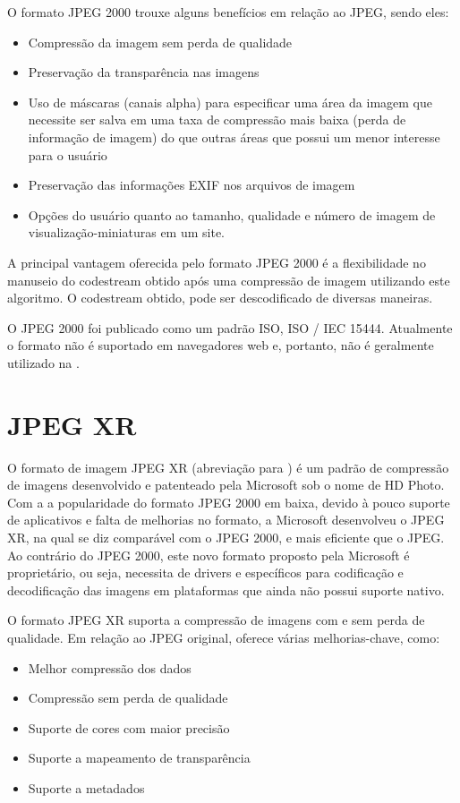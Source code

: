 \documentclass[espaco=simples,appendix=Name]{abnt}
\begin{document}
O formato JPEG 2000 trouxe alguns benefícios em relação ao JPEG, sendo eles:
\begin{itemize}
	\item Compressão da imagem sem perda de qualidade
	\item Preservação da transparência nas imagens
	\item Uso de máscaras (canais alpha) para especificar uma área da imagem que necessite ser salva em uma taxa de compressão mais baixa (perda de informação de imagem) do que outras áreas que possui um menor interesse para o usuário
	\item Preservação das informações EXIF nos arquivos de imagem
	\item Opções do usuário quanto ao tamanho, qualidade e número de imagem de visualização-miniaturas em um site.
\end{itemize}

A principal vantagem oferecida pelo formato JPEG 2000 é a flexibilidade no manuseio do codestream obtido após uma compressão de imagem utilizando este algoritmo. O codestream obtido, pode ser descodificado de diversas maneiras.

O JPEG 2000 foi publicado como um padrão ISO, ISO / IEC 15444. Atualmente o formato não é suportado em navegadores web e, portanto, não é geralmente utilizado na .\cite{JPEG}

\section{JPEG XR}

O formato de imagem JPEG XR (abreviação para ) é um padrão de compressão de imagens desenvolvido e patenteado pela Microsoft sob o nome de HD Photo.
Com a a popularidade do formato JPEG 2000 em baixa, devido à pouco suporte de aplicativos e falta de melhorias no formato, a Microsoft desenvolveu o JPEG XR, na qual se diz comparável com o JPEG 2000, e mais eficiente que o JPEG. Ao contrário do JPEG 2000, este novo formato proposto pela Microsoft é proprietário, ou seja, necessita de drivers e  específicos para codificação e decodificação das imagens em plataformas que ainda não possui suporte nativo.

O formato JPEG XR suporta a compressão de imagens com e sem perda de qualidade. Em relação ao JPEG original, oferece várias melhorias-chave, como:
\begin{itemize}
\item Melhor compressão dos dados
\item Compressão sem perda de qualidade
\item Suporte de cores com maior precisão
\item Suporte a  mapeamento de transparência
\item Suporte a metadados
\end{itemize}
\end{document}
